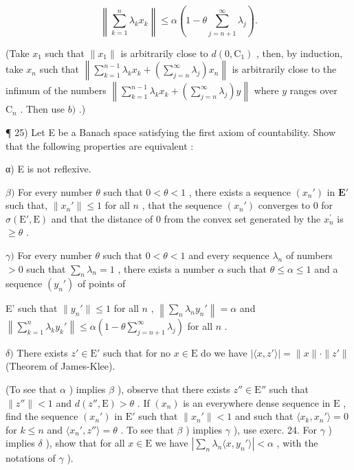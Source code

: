\[
\left\| \sum_ {k = 1} ^ {n} \lambda_ {k} x _ {k} \right\| \leqslant \alpha (1 - \theta \sum_ {j = n + 1} ^ {\infty} \lambda_ {j}).
\]

(Take \(x_{1}\) such that \(\| x_{1}\|\) is arbitrarily close to \(d(0, \mathrm{C}_{1})\) , then, by induction, take \(x_{n}\) such that \(\left\| \sum_{k=1}^{n-1} \lambda_{k} x_{k} + \left(\sum_{j=n}^{\infty} \lambda_{j}\right) x_{n}\right\|\) is arbitrarily close to the infimum of the numbers \(\left\| \sum_{k=1}^{n-1} \lambda_{k} x_{k} + \left(\sum_{j=n}^{\infty} \lambda_{j}\right) y\right\|\) where \(y\) ranges over \(\mathrm{C}_n\) . Then use \(b)\) .)

¶ 25) Let E be a Banach space satisfying the first axiom of countability. Show that the following properties are equivalent :

α) E is not reflexive.

\(\beta)\) For every number \(\theta\) such that \(0 < \theta < 1\) , there exists a sequence \((x_n')\) in \(\mathbf{E}'\) such that, \(\| x_n'\| \leqslant 1\) for all \(n\) , that the sequence \((x_n')\) converges to 0 for \(\sigma (\mathrm{E}',\mathrm{E})\) and that the distance of 0 from the convex set generated by the \(x_{n}^{\prime}\) is \(\geqslant \theta\) .

\(\gamma)\) For every number \(\theta\) such that \(0 < \theta < 1\) and every sequence \(\lambda_{n}\) of numbers \(>0\) such that \(\sum_{n} \lambda_{n} = 1\) , there exists a number \(\alpha\) such that \(\theta \leqslant \alpha \leqslant 1\) and a sequence \((y_{n}')\) of points of

E' such that \(\| y_n'\| \leqslant 1\) for all \(n\) , \(\left\| \sum_{n}\lambda_ny_n'\right\| = \alpha\) and \(\left\| \sum_{k=1}^{n}\lambda_ky_k'\right\| \leqslant \alpha (1 - \theta \sum_{j=n+1}^{\infty}\lambda_j)\) for all \(n\) .

\(\delta)\) There exists \(z' \in \mathrm{E}'\) such that for no \(x \in \mathrm{E}\) do we have \(\left|\langle x, z' \rangle\right| = \| x \| \cdot \| z'\|\) (Theorem of James-Klee).

(To see that \(\alpha\) ) implies \(\beta\) ), observe that there exists \(z'' \in \mathrm{E}''\) such that \(\| z'' \| < 1\) and \(d(z'', \mathrm{E}) > \theta\) . If \((x_n)\) is an everywhere dense sequence in \(\mathrm{E}\) , find the sequence \((x_n')\) in \(\mathrm{E}'\) such that \(\| x_n' \| < 1\) and such that \(\langle x_k, x_n' \rangle = 0\) for \(k \leqslant n\) and \(\langle x_n', z'' \rangle = \theta\) . To see that \(\beta\) ) implies \(\gamma\) ), use exerc. 24. For \(\gamma\) ) implies \(\delta\) ), show that for all \(x \in \mathrm{E}\) we have \(|\sum_{n} \lambda_n \langle x, y_n' \rangle| < \alpha\) , with the notations of \(\gamma\) ).

